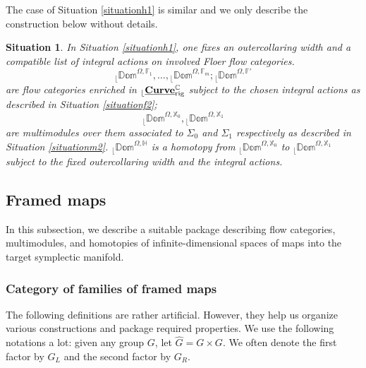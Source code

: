 \documentclass[reqno, 10pt]{amsart}
\numberwithin{equation}{section}
\numberwithin{equation}{section}
\newtheorem{situationh}{Situation}
\theoremstyle{definition}
\theoremstyle{remark}
\newcommand{\beqn}{\begin{equation*}}
\newcommand{\eeqn}{\end{equation*}}
\newcommand{\mb}{\mathbb}
\renewcommand{\outer}{{}_{\lfloor}}
\newcommand{\uds}[1]{\underline{\smash{#1}}}
\begin{document}
The case of Situation \ref{situationh1} is similar and we only describe the construction below without details.

\begin{situationh}\label{situationh2}
In Situation \ref{situationh1}, one fixes an outercollaring width and a compatible list of integral actions on involved Floer flow categories. 
\beqn
\outer \mb{Dom}^{\Omega, {\mb F}_1},\ldots, \outer \mb{Dom}^{\Omega, {\mb F}_m}; \outer \mb{Dom}^{\Omega, {\mb F}'}
\eeqn
are flow categories enriched in $\outer \uds{\bf Curve}_{\rm rig}^{\mb C}$ subject to the chosen integral actions as described in Situation \ref{situationf2};
\beqn
\outer \mb{Dom}^{\Omega, {\mb X}_0}, \outer \mb{Dom}^{\Omega, {\mb X}_1}
\eeqn
are multimodules over them associated to $\Sigma_0$ and $\Sigma_1$ respectively as described in Situation \ref{situationm2}. $\outer \mb{Dom}^{\Omega, {\mb H}}$ is a homotopy from $\outer \mb{Dom}^{\Omega, {\mb X}_0}$ to $\outer \mb{Dom}^{\Omega, {\mb X}_1}$ subject to the fixed outercollaring width and the integral actions.
\end{situationh}



\subsection{Framed maps}\label{subsection152}

In this subsection, we describe a suitable package describing flow categories, multimodules, and homotopies of infinite-dimensional spaces of maps into the target symplectic manifold. 


\subsubsection{Category of families of framed maps}

The following definitions are rather artificial. However, they help us organize various constructions and package required properties. We use the following notations a lot: given any group $G$, let $\hat G = G \times G$. We often denote the first factor by $G_L$ and the second factor by $G_R$.
\end{document}
